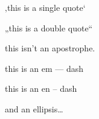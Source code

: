 
\def\mytitle{MultiMarkdown German Test}

‚this is a single quote`

„this is a double quote``

this isn't an apostrophe.

this is an em --- dash

this is an en -- dash

and an ellipsis{\ldots}




